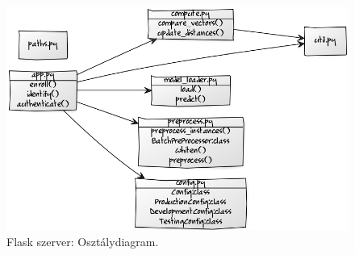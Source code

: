\begin{figure}[!ht]
	\centering
	\includegraphics[width=130mm, keepaspectratio]{figures/flask-class-diag.png}
	\caption{Flask szerver: Osztálydiagram.}
	\label{fig:flask-class-diag}
\end{figure}

